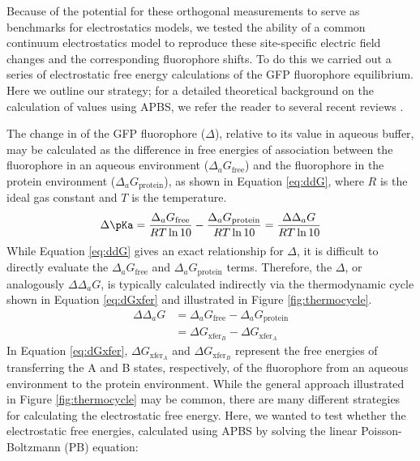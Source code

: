 Because of the potential for these orthogonal measurements to serve as benchmarks for electrostatics models, we tested the ability of a common continuum electrostatics model to reproduce these site-specific electric field changes and the corresponding fluorophore \pKa{} shifts.
To do this we carried out a series of electrostatic free energy calculations of the GFP fluorophore equilibrium.
Here we outline our strategy; for a detailed theoretical background on the calculation of \pKa{} values using APBS, we refer the reader to several recent reviews \cite{Baker2005, Baker2004, Baker2001, Wagoner2004, Unni2011}.

The change in \pKa{} of the GFP fluorophore ($\Delta$\pKa{}), relative to its value in aqueous buffer, may be calculated as the difference in free energies of association between the fluorophore in an aqueous environment ($\Delta_aG_\text{free}$) and the fluorophore in the protein environment ($\Delta_aG_\text{protein}$), as shown in Equation \ref{eq:ddG}, where $R$ is the ideal gas constant and $T$ is the temperature.
\begin{equation}
    \Delta \pKa = \frac{\Delta_aG_\text{free}}{RT \ln 10} - \frac{\Delta_aG_\text{protein}}{RT \ln 10} = \frac{\Delta\Delta_aG}{RT \ln 10}
    \label{eq:ddG}
\end{equation}
While Equation \ref{eq:ddG} gives an exact relationship for $\Delta$\pKa{}, it is difficult to directly evaluate the $\Delta_aG_\text{free}$ and $\Delta_aG_\text{protein}$ terms.
Therefore, the $\Delta$\pKa{}, or analogously $\Delta\Delta_aG$, is typically calculated indirectly via the thermodynamic cycle shown in Equation \ref{eq:dGxfer} and illustrated in Figure \ref{fig:thermocycle}.
\begin{equation}
    \begin{split}
    \Delta\Delta_a G &= \Delta_a G_{\text{free}} - \Delta_a G_{\text{protein}} \\
    &= \Delta G_{\text{xfer}_B} - \Delta G_{\text{xfer}_A}
    \end{split}
    \label{eq:dGxfer}
\end{equation}
In Equation \ref{eq:dGxfer}, $\Delta G_{\text{xfer}_A}$ and $\Delta G_{\text{xfer}_B}$ represent the free energies of transferring the A and B states, respectively, of the fluorophore from an aqueous environment to the protein environment.
While the general approach illustrated in Figure \ref{fig:thermocycle} may be common, there are many different strategies for calculating the electrostatic free energy.
Here, we wanted to test whether the electrostatic free energies, calculated using APBS by solving the linear Poisson-Boltzmann (PB) equation:
